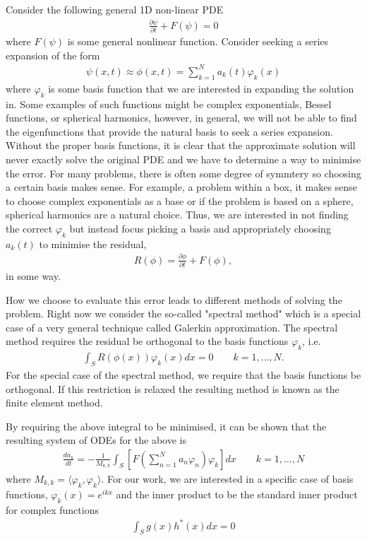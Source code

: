 Consider the following general 1D non-linear PDE
\begin{align}
\frac{\partial \psi}{\partial t} + F(\psi) = 0
\end{align}
where $F(\psi)$ is some general nonlinear function. Consider seeking a series expansion of the form
\begin{align}
\psi(x,t)\approx \phi(x,t) = \sum_{k=1}^{N}a_{k}(t)\varphi_{k}(x)
\end{align}
where $\varphi_{k}$ is some basis function that we are interested in expanding the solution in. Some examples of such functions might be complex exponentials, Bessel functions, or spherical harmonics, however, in general,  we will not be able to find the eigenfunctions that provide the natural basis to seek a series expansion. Without the proper basis functions, it is clear that the approximate solution will never exactly solve the original PDE and we have to determine a way to minimise the error. For many problems, there is often some degree of symmtery so choosing a certain basis makes sense. For example, a problem within a box, it makes sense to choose complex exponentials as a base or if the problem is based on a sphere, spherical harmonics are a natural choice. Thus, we are interested in not finding the correct $\varphi_{k}$ but instead focus picking a basis and appropriately choosing $a_{k}(t)$ to minimise the residual, 
\begin{align}
R(\phi) = \frac{\partial \phi}{\partial t} + F(\phi),
\end{align}
in some way.  

How we choose to evaluate this error leads to different methods of solving the problem. Right now we consider the so-called "spectral method" which is a special case of a very general technique called Galerkin approximation.  The spectral method requires the residual be orthogonal to the basis functions $\varphi_{k}$, i.e.
\begin{align}
\int_{S}R(\phi(x))\varphi_{k}(x)dx = 0 \qquad k=1,\ldots,N.
\end{align}
For the special case of the spectral method, we require that the basis functions be orthogonal. If this restriction is relaxed the resulting method is known as the finite element method. 

By requiring the above integral to be minimised, it can be shown\cite{durran} that the resulting system of ODEs for the above is
\begin{align}
\frac{d a_{k}}{dt} = -\frac{1}{M_{k,k}}\int_{S}\left[F\left(\sum_{n=1}^{N}a_{n}\varphi_{n}\right)\varphi_{k}\right]dx \qquad k=1,\ldots,N
\end{align}
where $M_{k,k}=\langle \varphi_{k},\varphi_{k}\rangle$. For our work, we are interested in a specific case of basis functions, $\varphi_{k}(x)=e^{ikx}$ and the inner product to be the standard inner product for complex functions
\begin{align}
\int_{S}g(x)h^{*}(x)dx=0 
\end{align}

